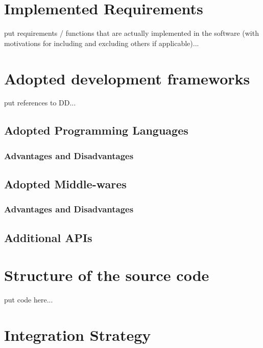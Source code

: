\documentclass[a4paper, hidelinks, 12pt]{report}
\begin{document}
	\chapter{Implemented Requirements}	
put requirements / functions that are actually implemented in the software (with motivations for including and excluding others if applicable)...
	
	\chapter{Adopted development frameworks}
put references to DD...
	\section{Adopted Programming Languages}
	\subsection{Advantages and Disadvantages}
	\section{Adopted Middle-wares}
	\subsection{Advantages and Disadvantages}
	\section{Additional APIs}

\chapter{Structure of the source code}
put code here...		


	\chapter{Integration Strategy}
\end{document}
